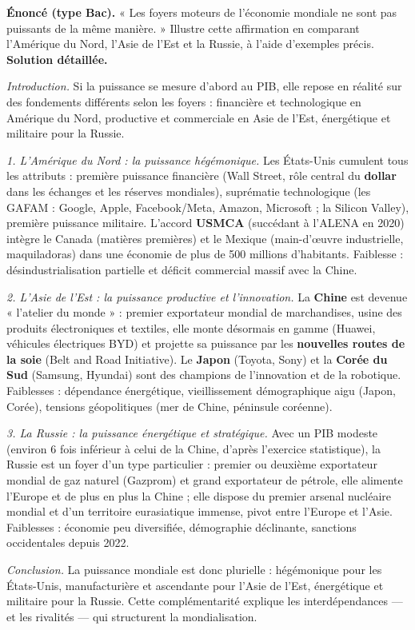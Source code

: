 \documentclass[11pt]{article}
\begin{document}
\begin{exoresolu}
\textbf{Énoncé (type Bac).} « Les foyers moteurs de l'économie mondiale ne sont pas puissants de la même manière. » Illustre cette affirmation en comparant l'Amérique du Nord, l'Asie de l'Est et la Russie, à l'aide d'exemples précis.
\tcblower
\textbf{Solution détaillée.}

\emph{Introduction.} Si la puissance se mesure d'abord au PIB, elle repose en réalité sur des fondements différents selon les foyers : financière et technologique en Amérique du Nord, productive et commerciale en Asie de l'Est, énergétique et militaire pour la Russie.

\emph{1. L'Amérique du Nord : la puissance hégémonique.} Les États-Unis cumulent tous les attributs : première puissance financière (Wall Street, rôle central du \textbf{dollar} dans les échanges et les réserves mondiales), suprématie technologique (les GAFAM : Google, Apple, Facebook/Meta, Amazon, Microsoft ; la Silicon Valley), première puissance militaire. L'accord \textbf{USMCA} (succédant à l'ALENA en 2020) intègre le Canada (matières premières) et le Mexique (main-d'œuvre industrielle, maquiladoras) dans une économie de plus de 500 millions d'habitants. Faiblesse : désindustrialisation partielle et déficit commercial massif avec la Chine.

\emph{2. L'Asie de l'Est : la puissance productive et l'innovation.} La \textbf{Chine} est devenue « l'atelier du monde » : premier exportateur mondial de marchandises, usine des produits électroniques et textiles, elle monte désormais en gamme (Huawei, véhicules électriques BYD) et projette sa puissance par les \textbf{nouvelles routes de la soie} (Belt and Road Initiative). Le \textbf{Japon} (Toyota, Sony) et la \textbf{Corée du Sud} (Samsung, Hyundai) sont des champions de l'innovation et de la robotique. Faiblesses : dépendance énergétique, vieillissement démographique aigu (Japon, Corée), tensions géopolitiques (mer de Chine, péninsule coréenne).

\emph{3. La Russie : la puissance énergétique et stratégique.} Avec un PIB modeste (environ 6 fois inférieur à celui de la Chine, d'après l'exercice statistique), la Russie est un foyer d'un type particulier : premier ou deuxième exportateur mondial de gaz naturel (Gazprom) et grand exportateur de pétrole, elle alimente l'Europe et de plus en plus la Chine ; elle dispose du premier arsenal nucléaire mondial et d'un territoire eurasiatique immense, pivot entre l'Europe et l'Asie. Faiblesses : économie peu diversifiée, démographie déclinante, sanctions occidentales depuis 2022.

\emph{Conclusion.} La puissance mondiale est donc plurielle : hégémonique pour les États-Unis, manufacturière et ascendante pour l'Asie de l'Est, énergétique et militaire pour la Russie. Cette complémentarité explique les interdépendances — et les rivalités — qui structurent la mondialisation.
\end{exoresolu}
\end{document}
